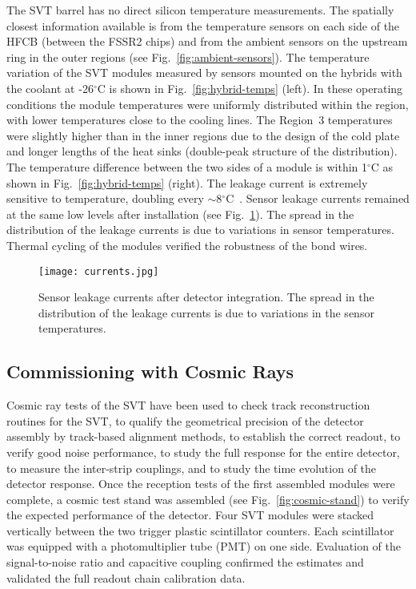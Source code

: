 The SVT barrel has no direct silicon temperature measurements. The spatially closest information available is
from the temperature sensors on each side of the HFCB (between the FSSR2 chips) and from the ambient sensors
on the upstream ring in the outer regions (see Fig.~\ref{fig:ambient-sensors}). The temperature variation of the
SVT modules measured by sensors mounted on the hybrids with the coolant at -26$^\circ$C is shown in
Fig.~\ref{fig:hybrid-temps} (left). In these operating conditions the module temperatures were uniformly
distributed within the region, with lower temperatures close to the cooling lines. The Region~3 temperatures were
slightly higher than in the inner regions due to the design of the cold plate and longer lengths of the heat sinks
(double-peak structure of the distribution). The temperature difference between the two sides of a module is
within 1$^\circ$C as shown in Fig.~\ref{fig:hybrid-temps} (right). The leakage current is extremely sensitive to
temperature, doubling every $\sim$8$^\circ$C~\cite{SZE}. Sensor leakage currents remained at the same
low levels after installation (see Fig.~\ref{fig:currents}). The spread in the distribution of the leakage currents
is due to variations in sensor temperatures. Thermal cycling of the modules verified the robustness of the bond
wires.

\begin{figure}[hbt] 
\centering 
\texttt{[image: currents.jpg]}
\caption{Sensor leakage currents after detector integration. The spread in the distribution of the leakage currents
  is due to variations in the sensor temperatures.}
\label{fig:currents}
\end{figure}

\subsection{Commissioning with Cosmic Rays}

Cosmic ray tests of the SVT have been used to check track reconstruction routines for the SVT, to qualify the
geometrical precision of the detector assembly by track-based alignment methods, to establish the correct
readout, to verify good noise performance, to study the full response for the entire detector, to measure the
inter-strip couplings, and to study the time evolution of the detector response. Once the reception tests of the
first assembled modules were complete, a cosmic test stand was assembled (see Fig.~\ref{fig:cosmic-stand}) to
verify the expected performance of the detector. Four SVT modules were stacked vertically between the two
trigger plastic scintillator counters. Each scintillator was equipped with a photomultiplier tube (PMT) on one side.
Evaluation of the signal-to-noise ratio and capacitive coupling confirmed the estimates and validated the full
readout chain calibration data.

